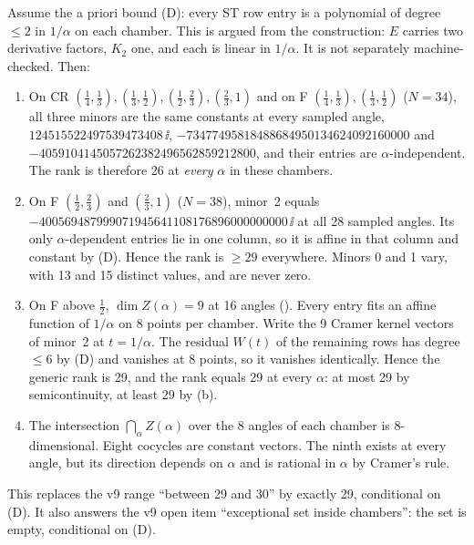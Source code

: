 \begin{theorem}
\label{thm:v10chamber}
Assume the a priori bound (D): every ST row entry is a polynomial of
degree \(\le2\) in \(1/\alpha\) on each chamber. This is argued from
the construction: \(E\) carries two derivative factors, \(K_2\) one,
and each is linear in \(1/\alpha\). It is not separately
machine-checked. Then:
\begin{enumerate}[label=(\alph*)]
\item On CR \((\tfrac14,\tfrac13),(\tfrac13,\tfrac12),(\tfrac12,\tfrac23),(\tfrac23,1)\)
and on F \((\tfrac14,\tfrac13),(\tfrac13,\tfrac12)\) (\(N=34\)), all
three minors are the same constants at every sampled angle,
\(124515522497539473408\,\ii\),
\(-73477495818488684950134624092160000\) and
\(-4059104145057262382496562859212800\), and their entries are
\(\alpha\)-independent. The rank is therefore 26 at \emph{every}
\(\alpha\) in these chambers.
\item On F \((\tfrac12,\tfrac23)\) and \((\tfrac23,1)\) (\(N=38\)),
minor~2 equals \(-400569487999071945641108176896000000000\,\ii\) at
all 28 sampled angles. Its only \(\alpha\)-dependent entries lie in
one column, so it is affine in that column and constant by (D). Hence
the rank is \(\ge29\) everywhere. Minors 0 and 1 vary, with 13 and
15 distinct values, and are never zero.
\item On F above \(\tfrac12\), \(\dim Z(\alpha)=9\) at 16 angles
(). Every entry fits an affine function of
\(1/\alpha\) on 8 points per chamber. Write the 9 Cramer kernel
vectors of minor~2 at \(t=1/\alpha\). The residual \(W(t)\) of the
remaining rows has degree \(\le6\) by (D) and vanishes at 8 points,
so it vanishes identically. Hence the generic rank is 29, and the
rank equals 29 at every \(\alpha\): at most 29 by semicontinuity,
at least 29 by (b).
\item The intersection \(\bigcap_\alpha Z(\alpha)\) over the 8
angles of each chamber is 8-dimensional. Eight cocycles are constant
vectors. The ninth exists at every angle, but its direction depends
on \(\alpha\) and is rational in \(\alpha\) by Cramer's rule.
\end{enumerate}
\end{theorem}
This replaces the v9 range ``between 29 and 30'' by exactly 29,
conditional on (D). It also answers the v9 open item ``exceptional
set inside chambers'': the set is empty, conditional on (D).

